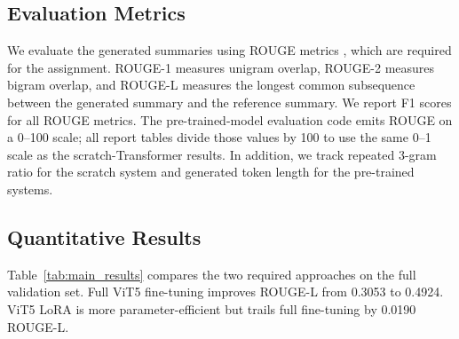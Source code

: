 \documentclass[conference]{IEEEtran}
\begin{document}
\begin{table}[htbp]
\centering
\caption{Hyperparameters for pre-trained model fine-tuning.}
\label{tab:hparams_pretrained}
\end{table}

\subsection{Evaluation Metrics}
We evaluate the generated summaries using ROUGE metrics \cite{lin2004rouge}, which are required for the assignment. ROUGE-1 measures unigram overlap, ROUGE-2 measures bigram overlap, and ROUGE-L measures the longest common subsequence between the generated summary and the reference summary. We report F1 scores for all ROUGE metrics. The pre-trained-model evaluation code emits ROUGE on a 0--100 scale; all report tables divide those values by 100 to use the same 0--1 scale as the scratch-Transformer results. In addition, we track repeated 3-gram ratio for the scratch system and generated token length for the pre-trained systems.

\subsection{Quantitative Results}
Table~\ref{tab:main_results} compares the two required approaches on the full validation set. Full ViT5 fine-tuning improves ROUGE-L from 0.3053 to 0.4924. ViT5 LoRA is more parameter-efficient but trails full fine-tuning by 0.0190 ROUGE-L.

\begin{table}[htbp]
\centering
\caption{Main results on the full validation set.}
\label{tab:main_results}
\end{table}
\end{document}
